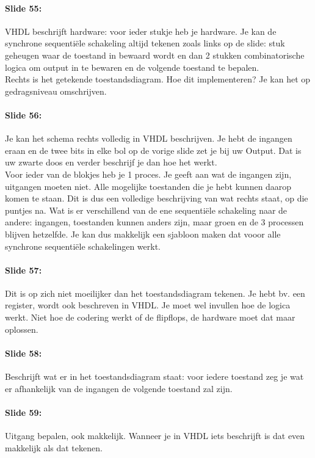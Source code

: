 \documentclass[10pt,a4paper]{book}
\begin{document}
\paragraph{Slide 55:} VHDL beschrijft hardware: voor ieder stukje heb je hardware. Je kan de synchrone sequenti\"ele schakeling altijd tekenen zoals links op de slide: stuk geheugen waar de toestand in bewaard wordt en dan 2 stukken combinatorische logica om output in te bewaren en de volgende toestand te bepalen.\\
Rechts is het getekende toestandsdiagram. Hoe dit implementeren? Je kan het op gedragsniveau omschrijven.

\paragraph{Slide 56:} Je kan het schema rechts volledig in VHDL beschrijven. Je hebt de ingangen eraan en de twee bits in elke bol op de vorige slide zet je bij uw Output. Dat is uw zwarte doos en verder beschrijf je dan hoe het werkt.\\
Voor ieder van de blokjes heb je 1 proces. Je geeft aan wat de ingangen zijn, uitgangen moeten niet.
Alle mogelijke toestanden die je hebt kunnen daarop komen te staan.
Dit is dus een volledige beschrijving van wat rechts staat, op die puntjes na.
Wat is er verschillend van de ene sequenti\"ele schakeling naar de andere: ingangen, toestanden kunnen anders zijn, maar groen en de 3 processen blijven hetzelfde.
Je kan dus makkelijk een sjabloon maken dat vooor alle synchrone sequenti\"ele schakelingen werkt. 

\paragraph{Slide 57:} Dit is op zich niet moeilijker dan het toestandsdiagram tekenen. Je hebt bv. een register, wordt ook beschreven in VHDL. Je moet wel invullen hoe de logica werkt. Niet hoe de codering werkt of de flipflops, de hardware moet dat maar oplossen.

\paragraph{Slide 58:} Beschrijft wat er in het toestandsdiagram staat: voor iedere toestand zeg je wat er afhankelijk van de ingangen de volgende toestand zal zijn. 

\paragraph{Slide 59:} Uitgang bepalen, ook makkelijk. Wanneer je in VHDL iets beschrijft is dat even makkelijk als dat tekenen.
\end{document}
